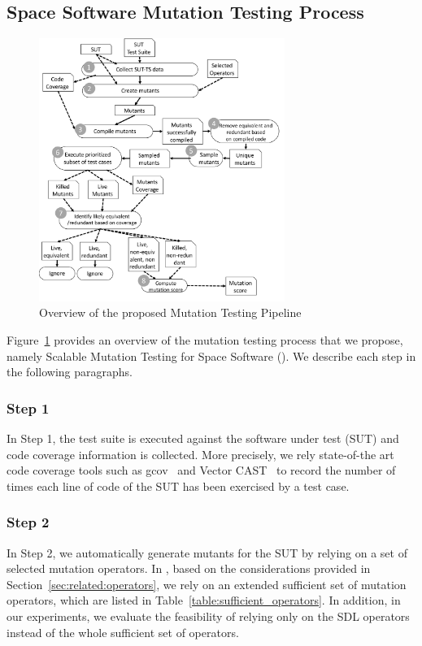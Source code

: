 \subsection{Space Software Mutation Testing Process}
\label{sec:approach}

\begin{figure}[tb]
\begin{center}
\includegraphics[width=8cm]{images/Approach}
\caption{Overview of the proposed Mutation Testing Pipeline}
\label{fig:approach}
\end{center}
\end{figure}

Figure~\ref{fig:approach} provides an overview of the mutation testing process that we propose, namely Scalable Mutation Testing for Space Software  (\APPR). We describe each step in the following paragraphs. 

\subsubsection{Step 1}

In Step 1, the test suite is executed against the software under test (SUT) and code coverage information is collected. 
More precisely, we rely state-of-the art code coverage tools such as gcov~\cite{GCOV} and Vector CAST~\cite{VectorCAST} 
to record the number of times each line of code of the SUT has been exercised by a test case.

\subsubsection{Step 2}

In Step 2, we automatically generate mutants for the SUT by relying on a set of selected mutation operators.
In \APPR, based on the considerations provided in Section~\ref{sec:related:operators}, we rely on an extended sufficient set of mutation operators, which are listed in Table~\ref{table:sufficient_operators}.
In addition, in our experiments, we evaluate the feasibility of relying only on the SDL operators instead of the whole sufficient set of operators.

